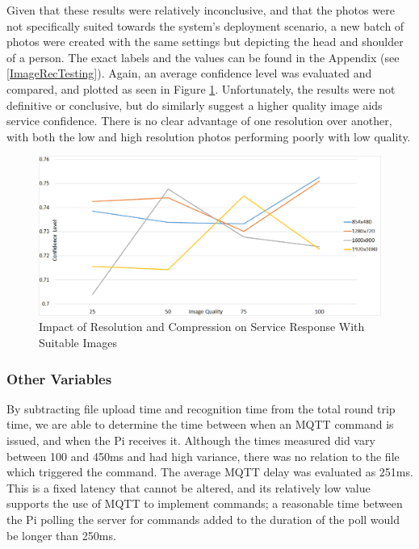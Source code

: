 \documentclass{article}
\begin{document}
Given that these results were relatively inconclusive, and that the photos were not specifically suited towards the system's deployment scenario, a new batch of photos were created with the same settings but depicting the head and shoulder of a person. The exact labels and the values can be found in the Appendix (see \ref{ImageRecTesting}). Again, an average confidence level was evaluated and compared, and plotted as seen in Figure \ref{fig:ImageResImpactOnPerson}. Unfortunately, the results were not definitive or conclusive, but do similarly suggest a higher quality image aids service confidence. There is no clear advantage of one resolution over another, with both the low and high resolution photos performing poorly with low quality.

\begin{figure}[h]
\centering
\caption{Impact of Resolution and Compression on Service Response With Suitable Images\label{fig:ImageResImpactOnPerson}}
\includegraphics[width=\textwidth]{ImageResImpactOnPerson}
\end{figure}

\subsubsection{Other Variables}
By subtracting file upload time and recognition time from the total round trip time, we are able to determine the time between when an MQTT command is issued, and when the Pi receives it. Although the times measured did vary between 100 and 450ms and had high variance, there was no relation to the file which triggered the command. The average MQTT delay was evaluated as 251ms. This is a fixed latency that cannot be altered, and its relatively low value supports the use of MQTT to implement commands; a reasonable time between the Pi polling the server for commands added to the duration of the poll would be longer than 250ms. 
\end{document}

